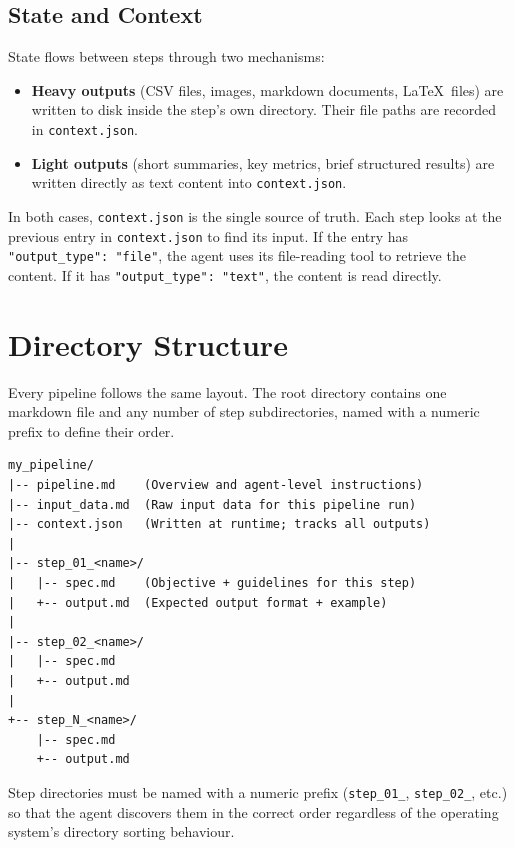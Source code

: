 \documentclass[12pt, a4paper]{article}
\begin{document}
\subsection{State and Context}

State flows between steps through two mechanisms:

\begin{itemize}[leftmargin=1.5em]
  \item \textbf{Heavy outputs} (CSV files, images, markdown documents, \LaTeX\ files) are written to disk inside the step's own directory. Their file paths are recorded in \texttt{context.json}.
  \item \textbf{Light outputs} (short summaries, key metrics, brief structured results) are written directly as text content into \texttt{context.json}.
\end{itemize}

In both cases, \texttt{context.json} is the single source of truth. Each step looks at the previous entry in \texttt{context.json} to find its input. If the entry has \texttt{"output\_type": "file"}, the agent uses its file-reading tool to retrieve the content. If it has \texttt{"output\_type": "text"}, the content is read directly.

\section{Directory Structure}

Every pipeline follows the same layout. The root directory contains one markdown file and any number of step subdirectories, named with a numeric prefix to define their order.

\begin{lstlisting}
my_pipeline/
|-- pipeline.md    (Overview and agent-level instructions)
|-- input_data.md  (Raw input data for this pipeline run)
|-- context.json   (Written at runtime; tracks all outputs)
|
|-- step_01_<name>/
|   |-- spec.md    (Objective + guidelines for this step)
|   +-- output.md  (Expected output format + example)
|
|-- step_02_<name>/
|   |-- spec.md
|   +-- output.md
|
+-- step_N_<name>/
    |-- spec.md
    +-- output.md
\end{lstlisting}

\begin{warnbox}
Step directories must be named with a numeric prefix (\texttt{step\_01\_}, \texttt{step\_02\_}, etc.) so that the agent discovers them in the correct order regardless of the operating system's directory sorting behaviour.
\end{warnbox}
\end{document}
